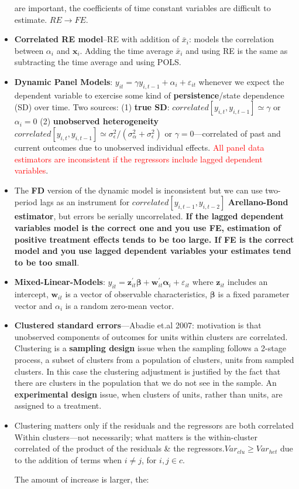\documentclass[
]{article}
\begin{document}
\begin{itemize}
  are important, the coefficients of time constant variables are
  difficult to estimate. \(RE \to FE\).
\item
  \textbf{Correlated RE model}--RE with addition of \(\bar{x}_i\):
  models the correlation between \(\alpha_i\) and
  \(\boldsymbol{x}_{i}\). Adding the time average \(\bar{x}_i\) and
  using RE is the same as subtracting the time average and using POLS.
\item
  \textbf{Dynamic Panel Models}:
  \(y_{i t}=\gamma y_{i, t-1}+\alpha_{i}+\varepsilon_{i t}\) whenever we
  expect the dependent variable to exercise some kind of
  \textbf{persistence}/state dependence (SD) over time. Two sources: (1)
  \textbf{true SD}: \(correlated[y_{i, t}, y_{i, t-1}] \simeq \gamma\)
  or \(\alpha_i = 0\) (2) \textbf{unobserved heterogeneity}
  \(correlated[y_{i, t}, y_{i, t-1}] \simeq \sigma_\epsilon^2/(\sigma_\alpha^2 + \sigma_\epsilon^2)\)
  or \(\gamma = 0\)---correlated of past and current outcomes due to
  unobserved individual effects.
  \textcolor{red}{All panel data estimators are inconsistent if the regressors include lagged dependent variables}.
\item
  The \textbf{FD} version of the dynamic model is inconsistent but we
  can use two-period lags as an instrument for
  \(correlated[y_{i, t-1}, y_{i, t-2}]\) \textbf{Arellano-Bond
  estimator}, but errors be serially uncorrelated. \textbf{If the lagged
  dependent variables model is the correct one and you use FE,
  estimation of positive treatment effects tends to be too large. If FE
  is the correct model and you use lagged dependent variables your
  estimates tend to be too small}.
\item
  \textbf{Mixed-Linear-Models}:
  \(y_{i t}=\mathbf{z}_{i t}^{\prime} \boldsymbol{\beta}+\mathbf{w}_{i t}^{\prime} \boldsymbol{\alpha}_{i}+\varepsilon_{i t}\)
  where \(\mathbf{z}_{i t}\) includes an intercept, \(\mathbf{w}_{i t}\)
  is a vector of observable characteristics, \(\boldsymbol{\beta}\) is a
  fixed parameter vector and \(\alpha_{i}\) is a random zero-mean
  vector.
\item
  \textbf{Clustered standard errors}---Abadie et.al 2007: motivation is
  that unobserved components of outcomes for units within clusters are
  correlated. Clustering is a \textbf{sampling design} issue when the
  sampling follows a 2-stage process, a subset of clusters from a
  population of clusters, units from sampled clusters. In this case the
  clustering adjustment is justified by the fact that there are clusters
  in the population that we do not see in the sample. An
  \textbf{experimental design} issue, when clusters of units, rather
  than units, are assigned to a treatment.
\item
  Clustering matters only if the residuals and the regressors are both
  correlated Within clusters---not necessarily; what matters is the
  within-cluster correlated of the product of the residuals \& the
  regressors.\(Var_{clu} \ge Var_{het}\) due to the addition of terms
  when \(i \ne j\), for \(i, j \in c\).

  The amount of increase is larger, the:
\end{itemize}
\end{document}
